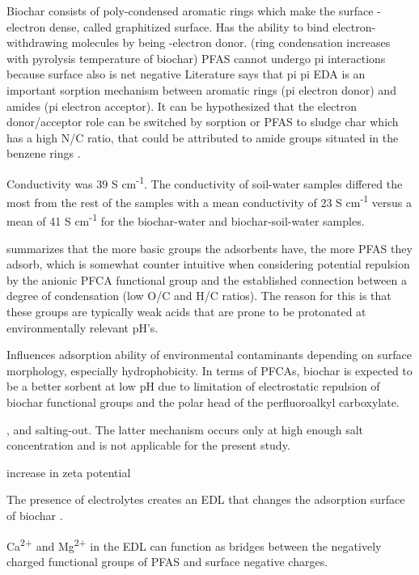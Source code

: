  Biochar consists of poly-condensed aromatic rings which make the surface \textpi-electron dense, called graphitized surface. Has the ability to bind electron-withdrawing molecules by being \textpi-electron donor. (ring condensation increases with pyrolysis temperature of biochar) PFAS cannot undergo pi interactions because surface also is net negative \citep{Li2019} Literature says that pi pi EDA is an important sorption mechanism between aromatic rings (pi electron donor) and amides (pi electron acceptor). It can be hypothesized that the electron donor/acceptor role can be switched by sorption or PFAS to sludge char which has a high N/C ratio, that could be attributed to amide groups situated in the benzene rings \citep{Li2019}.
 
 Conductivity was 39  \textmu S cm\textsuperscript{-1}. The conductivity of soil-water samples differed the most from the rest of the samples with a mean conductivity of 23  \textmu S cm\textsuperscript{-1} versus a mean of 41  \textmu S cm\textsuperscript{-1} for the biochar-water and biochar-soil-water samples. 
 
 \cite{du2014adsorption} summarizes that the more basic groups the adsorbents have, the more PFAS they adsorb, which is somewhat counter intuitive when considering potential repulsion by the anionic PFCA functional group and the established connection between a degree of condensation (low O/C and H/C ratios). The reason for this is that these groups are typically weak acids that are prone to be protonated at environmentally relevant pH's. 
 
 Influences adsorption ability of environmental contaminants depending on surface morphology, especially hydrophobicity. In terms of PFCAs, biochar is expected to be a better sorbent at low pH due to limitation of electrostatic repulsion of biochar functional groups and the polar head of the perfluoroalkyl carboxylate. 
 
 , and salting-out. The latter mechanism occurs only at high enough salt concentration and is not applicable for the present study. 
 
 increase in zeta potential
 
 The presence of electrolytes creates an EDL that changes the adsorption surface of biochar \citep{du2014adsorption}.
 
 Ca\textsuperscript{2+} and Mg\textsuperscript{2+} in the EDL can function as bridges between the negatively charged functional groups of PFAS and surface negative charges.
 

